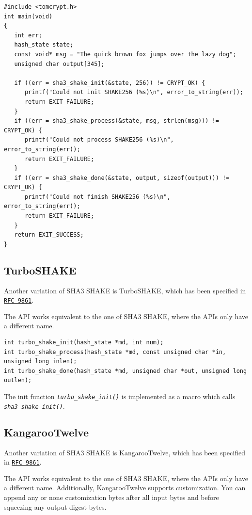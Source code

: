 \documentclass[synpaper]{book}
\newcommand{\code}[1]{\texttt{\textit{#1}}}
\begin{document}
\begin{small}
\begin{verbatim}
#include <tomcrypt.h>
int main(void)
{
   int err;
   hash_state state;
   const void* msg = "The quick brown fox jumps over the lazy dog";
   unsigned char output[345];

   if ((err = sha3_shake_init(&state, 256)) != CRYPT_OK) {
      printf("Could not init SHAKE256 (%s)\n", error_to_string(err));
      return EXIT_FAILURE;
   }
   if ((err = sha3_shake_process(&state, msg, strlen(msg))) != CRYPT_OK) {
      printf("Could not process SHAKE256 (%s)\n", error_to_string(err));
      return EXIT_FAILURE;
   }
   if ((err = sha3_shake_done(&state, output, sizeof(output))) != CRYPT_OK) {
      printf("Could not finish SHAKE256 (%s)\n", error_to_string(err));
      return EXIT_FAILURE;
   }
   return EXIT_SUCCESS;
}
\end{verbatim}
\end{small}

\subsection{TurboSHAKE}
Another variation of SHA3 SHAKE is TurboSHAKE, which has been specified in \href{https://datatracker.ietf.org/doc/rfc9861/}{\texttt{RFC 9861}}.

The API works equivalent to the one of SHA3 SHAKE, where the APIs only have a different name.

\begin{small}
\begin{verbatim}
int turbo_shake_init(hash_state *md, int num);
int turbo_shake_process(hash_state *md, const unsigned char *in, unsigned long inlen);
int turbo_shake_done(hash_state *md, unsigned char *out, unsigned long outlen);
\end{verbatim}
\end{small}

The init function \code{turbo\_shake\_init()} is implemented as a macro which calls \code{sha3\_shake\_init()}.


\subsection{KangarooTwelve}
Another variation of SHA3 SHAKE is KangarooTwelve, which has been specified in \href{https://datatracker.ietf.org/doc/rfc9861/}{\texttt{RFC 9861}}.

The API works equivalent to the one of SHA3 SHAKE, where the APIs only have a different name. Additionally, KangarooTwelve supports customization. You can append any or none customization bytes after all input bytes and before squeezing any output digest bytes.
\end{document}
